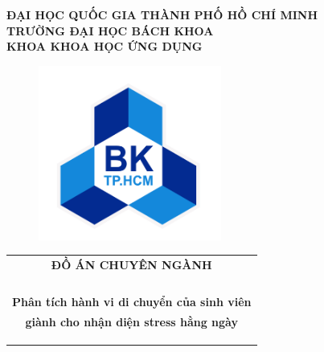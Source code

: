 \documentclass[13pt,a4paper,font=cm]{report}
\theoremstyle{definition}
\begin{document}
\begin{titlepage}


\begin{center}
\LARGE \textbf{ĐẠI HỌC QUỐC GIA THÀNH PHỐ HỒ CHÍ MINH} \\
\vspace{0.2cm}
\LARGE \textbf{TRƯỜNG ĐẠI HỌC BÁCH KHOA} \\
\vspace{0.2cm}
\LARGE \textbf{KHOA KHOA HỌC ỨNG DỤNG}
\end{center}

\vspace{0.3cm}

\begin{figure}[h!]
\begin{center}
\includegraphics[width=6cm]{Images/hcmut.png}
\end{center}
\end{figure}

\begin{center}
\begin{tabular}{c}
\multicolumn{1}{c}{\textbf{{\LARGE ĐỒ ÁN CHUYÊN NGÀNH}}}\\
\\{\textbf{{\Huge }}}
\\
\\
\\ \textbf{\Huge Phân tích hành vi di chuyển của sinh viên } \\ \textbf{\Huge giành cho nhận diện stress hằng ngày}
\\
\\
\\
\\



\end{tabular}
\end{center}
\end{titlepage}
\end{document}
